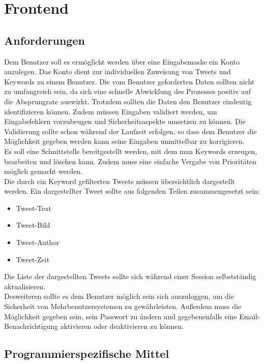 \section{Frontend} 


\subsection{Anforderungen}


Dem Benutzer soll es ermöglicht werden über eine Eingabemaske ein Konto anzulegen. Das Konto dient zur 
individuellen Zuweisung von Tweets und Keywords zu einem Benutzer. Die vom Benutzer geforderten Daten 
sollten nicht zu umfangreich sein, da sich eine schnelle Abwicklung des Prozesses positiv auf die 
Absprungrate auswirkt. Trotzdem sollten die Daten den  Benutzer eindeutig identifizieren können. 
Zudem müssen Eingaben validiert werden, um Eingabefehlern vorzubeugen und Sicherheitsaspekte umsetzen 
zu können. Die Validierung sollte schon während der Laufzeit erfolgen, so dass dem Benutzer die 
Möglichkeit gegeben werden kann seine Eingaben unmittelbar zu korrigieren. \\
Es soll eine Schnittstelle bereitgestellt werden, mit dem man Keywords erzeugen, bearbeiten und 
löschen kann. Zudem muss eine einfache Vergabe von Prioritäten möglich gemacht werden. \\
Die durch ein Keyword gefilterten Tweets müssen übersichtlich dargestellt werden. Ein dargestellter 
Tweet sollte aus folgenden Teilen zusammengesetzt sein:
\begin{itemize}
\item{Tweet-Text}
\item{Tweet-Bild}
\item{Tweet-Author}
\item{Tweet-Zeit}
\end{itemize} 
Die Liste der dargestellten Tweets sollte sich  während einer Session selbstständig aktualisieren. \\
Desweiteren sollte es dem Benutzer möglich sein sich auszuloggen, um die Sicherheit von 
Mehrbenutzersystemen zu gewährleisten. Außerdem muss die Möglichkeit gegeben sein, sein Passwort zu 
ändern und gegebenenfalls eine Email-Benachrichtigung aktivieren oder deaktivieren zu können.

\subsection{Programmierspezifische Mittel}
\medskip
